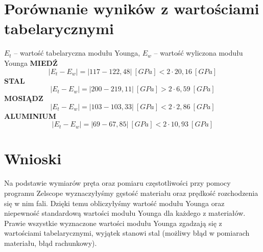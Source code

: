 \documentclass[a4paper,11pt]{article}
\begin{document}
\section{Porównanie wyników z wartościami tabelarycznymi}
$E_{t}$ -- wartość tabelaryczna modułu Younga, 
$E_{w}$ -- wartość wyliczona modułu Younga \newline
\textbf{MIEDŹ}
$$|E_{t}-E_{w}|=|117-122,48|~[GPa] < 2 \cdot 20,16~[GPa]$$
\textbf{STAL}
$$|E_{t}-E_{w}|=|200-219,11|~[GPa] >  2 \cdot 6,59~[GPa]$$
\textbf{MOSIĄDZ}
$$|E_{t}-E_{w}|=|103-103,33|~[GPa] <  2 \cdot 2,86~[GPa]$$
\textbf{ALUMINIUM}
$$|E_{t}-E_{w}|=|69-67,85|~[GPa]<  2 \cdot 10,93 ~[GPa]$$

\section{Wnioski}

Na podstawie wymiarów pręta oraz pomiaru częstotliwości przy pomocy programu Zelscope wyznaczyłyśmy gęstość materiału oraz prędkość rozchodzenia się w nim fali. Dzięki temu obliczyłyśmy wartość modułu Younga oraz niepewność standardową wartości modułu Younga dla każdego z materiałów. Prawie wszystkie wyznaczone wartości modułu Younga zgadzają się z wartościami tabelarycznymi, wyjątek stanowi stal (możliwy błąd w pomiarach materiału, błąd rachunkowy).
\end{document}

